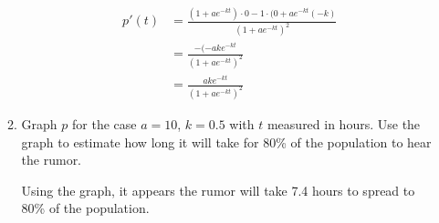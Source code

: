\documentclass{article}
\begin{document}
\begin{enumerate}
\begin{enumerate}
$$\begin{align}
					p'(t)&=\frac{(1+ae^{-kt})\cdot0 - 1\cdot(0+ae^{-kt}(-k)}{(1+ae^{-kt})^2}\\
					&= \frac{-(-ake^{-kt}}{(1+ae^{-kt})^2}\\
					&=\frac{ake^{-kt}}{(1+ae^{-kt})^2}
				\end{align}$$
			\item Graph $p$ for the case $a=10$, $k=0.5$ with $t$ measured in hours. Use the graph to estimate how long it will take for 80\% of the population to hear the rumor.
				\begin{center}
		\pgfplotsset{width=8cm,height=5cm}
				\end{center}
				Using the graph, it appears the rumor will take 7.4 hours to spread to 80\% of the population.
		\end{enumerate}
\end{enumerate}
\end{document}
